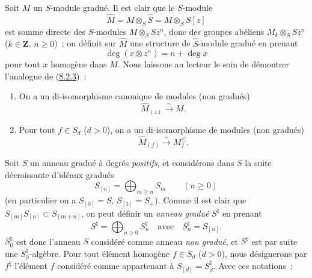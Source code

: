 \begin{env}[8.2.4]
\label{II.8.2.4-fr}
Soit $M$ un $S$-module gradué. Il est clair que le $S$-module
\begin{equation}
\label{II.8.2.4.1-fr}
  \widehat{M}=M\otimes_S\widehat{S}=M\otimes_S S[z]
\tag{8.2.4.1}
\end{equation}
est somme directe des $S$-modules $M\otimes_S Sz^n$, donc des groupes abéliens
$M_k\otimes_S Sz^n$ ($k\in\mathbf{Z}$, $n\geq0$)~; on définit sur
$\widehat{M}$ une structure de $\widehat{S}$-module gradué en prenant
\begin{equation}
\label{II.8.2.4.2-fr}
  \deg(x\otimes z^n)=n+\deg x
\tag{8.2.4.2}
\end{equation}
pour tout $x$ homogène dans $M$. Nous laissons au lecteur le soin de démontrer
l'analogue de (\hyperref[II.8.2.3-fr]{8.2.3})~:
\end{env}

\begin{lemma}[8.2.5]
\label{II.8.2.5-fr}
\begin{enumerate}
\item[\rm(i)] On a un di-isomorphisme canonique de modules (non gradués)
\begin{equation}
\label{II.8.2.5.1-fr}
  \widehat{M}_{(z)}\xrightarrow{\sim}M.
\tag{8.2.5.1}
\end{equation}
\item[\rm(ii)] Pour tout $f\in S_d$ ($d>0$), on a un di-isomorphisme de
modules (non gradués)
\begin{equation}
\label{II.8.2.5.2-fr}
  \widehat{M}_{(f)}\xrightarrow{\sim}M_f^{\leq}.
\tag{8.2.5.2}
\end{equation}
\end{enumerate}
\end{lemma}

\begin{env}[8.2.6]
\label{II.8.2.6-fr}
Soit $S$ un anneau gradué à degrés \emph{positifs}, et considérons dans $S$
la suite décroissante d'idéaux gradués
\begin{equation}
\label{II.8.2.6.1-fr}
  S_{[n]}=\bigoplus_{m\geq n}S_m\qquad(n\geq0)
\tag{8.2.6.1}
\end{equation}
(en particulier on a $S_{[0]}=S$, $S_{[1]}=S_+$). Comme il est clair que
$S_{[m]}S_{[n]}\subset S_{[m+n]}$, on peut définir un \emph{anneau gradué}
$S^\natural$ en prenant
\begin{equation}
\label{II.8.2.6.2-fr}
  S^\natural=\bigoplus_{n\geq0}S_n^\natural
  \quad\text{avec}\quad S_n^\natural=S_{[n]}.
\tag{8.2.6.2}
\end{equation}
$S_0^\natural$ est donc l'anneau $S$ considéré comme anneau \emph{non gradué},
et $S^\natural$ est par suite une $S_0^\natural$-algèbre. Pour tout élément
homogène $f\in S_d$ ($d>0$), nous désignerons par $f^\natural$ l'élément
$f$ considéré comme appartenant à $S_{[d]}=S_d^\natural$. Avec ces
notations~:
\end{env}

